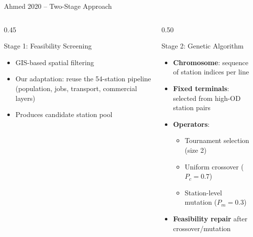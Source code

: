 \documentclass[aspectratio=169, 11pt]{beamer}
\begin{document}
\begin{frame}{Ahmed 2020 -- Two-Stage Approach}

\begin{columns}[T]
\begin{column}{0.45\textwidth}
\begin{block}{Stage 1: Feasibility Screening}
\begin{itemize}
    \item GIS-based spatial filtering
    \item Our adaptation: reuse the 54-station pipeline (population, jobs, transport, commercial layers)
    \item Produces candidate station pool
\end{itemize}
\end{block}
\end{column}
\begin{column}{0.50\textwidth}
\begin{block}{Stage 2: Genetic Algorithm}
\begin{itemize}
    \item \textbf{Chromosome}: sequence of station indices per line
    \item \textbf{Fixed terminals}: selected from high-OD station pairs
    \item \textbf{Operators}:
    \begin{itemize}
        \item Tournament selection (size 2)
        \item Uniform crossover (\(P_c = 0.7\))
        \item Station-level mutation (\(P_m = 0.3\))
    \end{itemize}
    \item \textbf{Feasibility repair} after crossover/mutation
\end{itemize}
\end{block}
\end{column}
\end{columns}
\end{frame}
\end{document}
